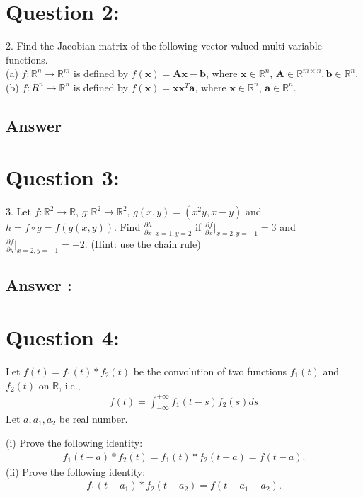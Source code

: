 \documentclass[a4paper,12pt]{article}
\newcommand{\R}{\mathbb{R}}
\begin{document}
\section*{Question 2:}
2. Find the Jacobian matrix of the following vector-valued multi-variable functions. \\
(a) \(f:\R^n \to \R^m \) is defined by \(f(\bm{x}) = \bm{A}\bm{x} - \bm{b}\), where \(\bm{x} \in \R^n\), \(\bm{A} \in \R^{m \times n}, \bm{b} \in \R^n\). \\
(b) \(f: R^n \to \R^n\) is defined by \(f(\bm{x}) = \bm{x}\bm{x}^T\bm{a}\), where \(\bm{x} \in \R^n\), \(\bm{a} \in \R^n\).

\subsection*{Answer}


\section*{Question 3:}
3. Let \(f : \R^2 \to \R\), \(g : \R^2 \to \R^2\), \(g(x, y) = (x^2y, x-y)\) and \(h = f \circ g = f(g(x, y))\). Find \(\frac {\partial h}{\partial x}|_{x=1, y=2}\) if
\(\frac{\partial f}{\partial x}|_{x=2, y=-1} = 3\) and \(\frac{\partial f}{\partial y}|_{x=2, y=-1} = -2\). (Hint: use the chain rule)

\subsection{Answer :}


\section*{Question 4:}
Let \(f(t) = f_1(t) * f_2(t)\) be the convolution of two functions \(f_1(t)\) and \(f_2(t)\) on \(\R\), i.e.,
\begin{align*}
    f(t) = \int_{-\infty}^{+\infty} f_1(t - s)f_2(s)ds
\end{align*}
Let \(a, a_1, a_2\) be real number.

(i) Prove the following identity:
\begin{align*}
    f_1(t-a)*f_2(t) = f_1(t) * f_2(t-a) = f(t-a).
\end{align*}
(ii) Prove the following identity:
\begin{align*}
    f_1(t-a_1) * f_2(t-a_2) = f(t-a_1-a_2).
\end{align*}
\end{document}
